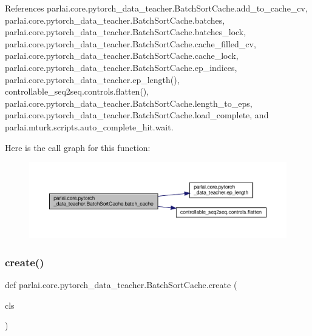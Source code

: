 References parlai.\+core.\+pytorch\+\_\+data\+\_\+teacher.\+Batch\+Sort\+Cache.\+add\+\_\+to\+\_\+cache\+\_\+cv, parlai.\+core.\+pytorch\+\_\+data\+\_\+teacher.\+Batch\+Sort\+Cache.\+batches, parlai.\+core.\+pytorch\+\_\+data\+\_\+teacher.\+Batch\+Sort\+Cache.\+batches\+\_\+lock, parlai.\+core.\+pytorch\+\_\+data\+\_\+teacher.\+Batch\+Sort\+Cache.\+cache\+\_\+filled\+\_\+cv, parlai.\+core.\+pytorch\+\_\+data\+\_\+teacher.\+Batch\+Sort\+Cache.\+cache\+\_\+lock, parlai.\+core.\+pytorch\+\_\+data\+\_\+teacher.\+Batch\+Sort\+Cache.\+ep\+\_\+indices, parlai.\+core.\+pytorch\+\_\+data\+\_\+teacher.\+ep\+\_\+length(), controllable\+\_\+seq2seq.\+controls.\+flatten(), parlai.\+core.\+pytorch\+\_\+data\+\_\+teacher.\+Batch\+Sort\+Cache.\+length\+\_\+to\+\_\+eps, parlai.\+core.\+pytorch\+\_\+data\+\_\+teacher.\+Batch\+Sort\+Cache.\+load\+\_\+complete, and parlai.\+mturk.\+scripts.\+auto\+\_\+complete\+\_\+hit.\+wait.

Here is the call graph for this function\+:
\nopagebreak
\begin{figure}[H]
\begin{center}
\leavevmode
\includegraphics[width=350pt]{classparlai_1_1core_1_1pytorch__data__teacher_1_1BatchSortCache_ae97120b4fec464f79c7d0d9cd54c101d_cgraph}
\end{center}
\end{figure}
\mbox{\label{classparlai_1_1core_1_1pytorch__data__teacher_1_1BatchSortCache_a272dbfe6529aa39066b4ad8504f40f5d}} 
\subsubsection{\texorpdfstring{create()}{create()}}
{\footnotesize\ttfamily def parlai.\+core.\+pytorch\+\_\+data\+\_\+teacher.\+Batch\+Sort\+Cache.\+create (\begin{DoxyParamCaption}\item[{}]{cls }\end{DoxyParamCaption})}

